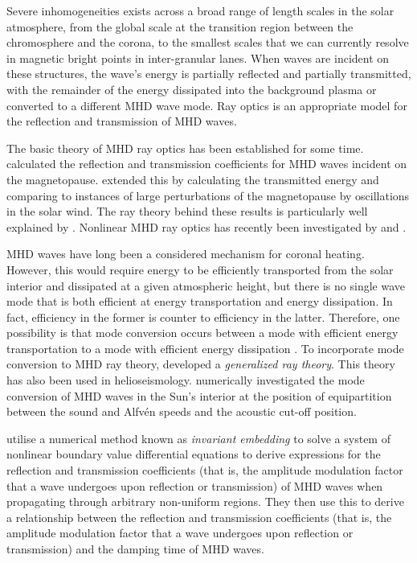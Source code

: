 \documentclass[12pt]{../style-files/ociamthesis}
\begin{document}
	Severe inhomogeneities exists across a broad range of length scales in the solar atmosphere, from the global scale at the transition region between the chromosphere and the corona, to the smallest scales that we can currently resolve in magnetic bright points in inter-granular lanes. When waves are incident on these structures, the wave's energy is partially reflected and partially transmitted, with the remainder of the energy dissipated into the background plasma or converted to a different MHD wave mode. Ray optics is an appropriate model for the reflection and transmission of MHD waves.
	
	The basic theory of MHD ray optics has been established for some time. \cite{mck70} calculated the reflection and transmission coefficients for MHD waves incident on the magnetopause. \cite{ver73} extended this by calculating the transmitted energy and \cite{wol_etal75} comparing to instances of large perturbations of the magnetopause by oscillations in the solar wind. The ray theory behind these results is particularly well explained by \cite{wal04}. Nonlinear MHD ray optics has recently been investigated by \cite{nun18} and \cite{nun20}.
	
	MHD waves have long been a considered mechanism for coronal heating. However, this would require energy to be efficiently transported from the solar interior and dissipated at a given atmospheric height, but there is no single wave mode that is both efficient at energy transportation and energy dissipation. In fact, efficiency in the former is counter to efficiency in the latter. Therefore, one possibility is that mode conversion occurs between a mode with efficient energy transportation to a mode with efficient energy dissipation \citep{par_etal12}. To incorporate mode conversion to MHD ray theory, \cite{shu_etal06} developed a \textit{generalized ray theory}. This theory has also been used in helioseismology. \cite{cal06} numerically investigated the mode conversion of MHD waves in the Sun's interior at the position of equipartition between the sound and Alfv\'{e}n speeds and the acoustic cut-off position.
	
	\cite{lee_etal02a} utilise a numerical method known as \textit{invariant embedding} to solve a system of nonlinear boundary value differential equations to derive expressions for the reflection and transmission coefficients (that is, the amplitude modulation factor that a wave undergoes upon reflection or transmission) of MHD waves when propagating through arbitrary non-uniform regions. They then use this to derive a relationship between the reflection and transmission coefficients (that is, the amplitude modulation factor that a wave undergoes upon reflection or transmission) and the damping time of MHD waves.
	
\end{document}
